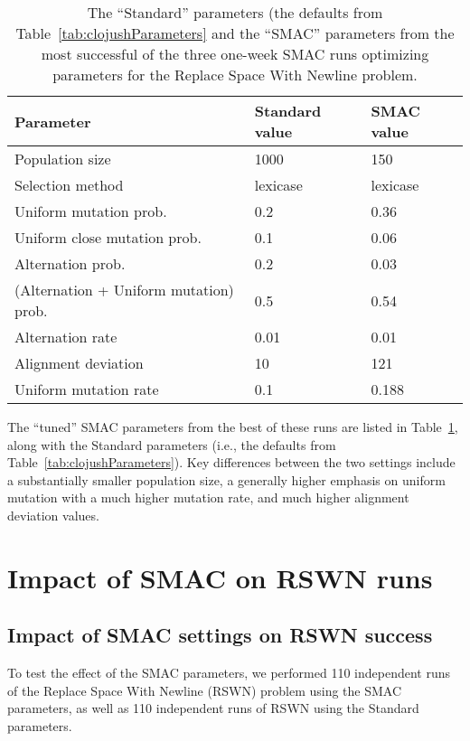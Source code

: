 \begin{table}
	\begin{center}
	\begin{tabular}{p{4cm} p{1.5cm} p{1.5cm}}
		Parameter & Standard value & SMAC  value \\
		\hline
		Population size & 1000 &  150 \\
		Selection method & lexicase & lexicase \\
		\hline
		Uniform mutation prob. & 0.2 & 0.36 \\
		Uniform close mutation prob. & 0.1 & 0.06 \\
		Alternation prob. & 0.2 & 0.03 \\
		(Alternation \linebreak + \quad Uniform mutation) prob. & 0.5 & 0.54 \\
		\hline
		Alternation rate & 0.01 & 0.01 \\
		Alignment deviation & 10 & 121 \\
		\hline
		Uniform mutation rate & 0.1 & 0.188
	\end{tabular}
	\end{center}
	\caption{The ``Standard'' parameters (the defaults from Table~\ref{tab:clojushParameters} and the ``SMAC'' parameters from the most successful of the three one-week SMAC
	runs optimizing parameters for the Replace Space With Newline problem.}
	\label{tab:SMACtunedParameters}
\end{table}

The ``tuned'' SMAC parameters from the best of these runs are listed in
Table~\ref{tab:SMACtunedParameters}, along with the Standard parameters
(i.e., the defaults from Table~\ref{tab:clojushParameters}). Key differences
between the two settings include a substantially smaller population size,
a generally higher emphasis on uniform mutation with a much higher
mutation rate, and much higher alignment deviation values.

\section{Impact of SMAC on RSWN runs}
\label{sec:SMACimpact}

\subsection{Impact of SMAC settings on RSWN success}
\label{sec:SMACsuccessRSWN}

To test the effect of the SMAC parameters, we performed 110
independent runs of the Replace Space With Newline (RSWN) problem using the
SMAC parameters, as well as 110 independent runs of RSWN using the
Standard parameters.

